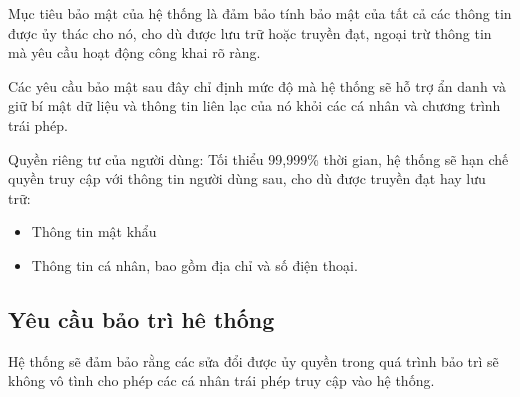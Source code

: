 \documentclass[./../main_file.tex]{subfiles}
\begin{document}
	Mục tiêu bảo mật của hệ thống là đảm bảo tính bảo mật của tất cả các thông tin được ủy thác cho nó, cho dù được lưu trữ hoặc truyền đạt, ngoại trừ thông tin mà yêu cầu hoạt động công khai rõ ràng.
	
	Các yêu cầu bảo mật sau đây chỉ định mức độ mà hệ thống sẽ hỗ trợ ẩn danh và giữ bí mật dữ liệu và thông tin liên lạc của nó khỏi các cá nhân và chương trình trái phép.
	
	Quyền riêng tư của người dùng: Tối thiểu 99,999\% thời gian, hệ thống sẽ hạn chế quyền truy cập với thông tin người dùng sau, cho dù được truyền đạt hay lưu trữ:
	
	\begin{itemize}
		\item Thông tin mật khẩu
		\item Thông tin cá nhân, bao gồm địa chỉ và số điện thoại.
	\end{itemize}
	
	\subsection{Yêu cầu bảo trì hê thống}
	Hệ thống sẽ đảm bảo rằng các sửa đổi được ủy quyền trong quá trình bảo trì sẽ không vô tình cho phép các cá nhân trái phép truy cập vào hệ thống.
\end{document}
